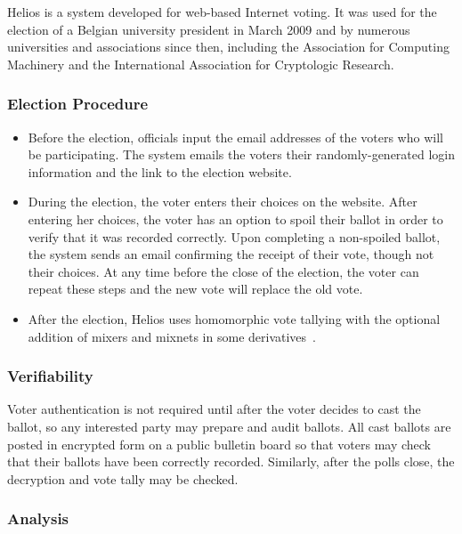 Helios is a system developed for web-based Internet voting. It was
used for the election of a Belgian university president in March 2009
and by numerous universities and associations since then, including
the Association for Computing Machinery and the International
Association for Cryptologic Research.

\subsubsection{Election Procedure}

\begin{itemize}

\item Before the election, officials input the email addresses of the
  voters who will be participating. The system emails the voters their
  randomly-generated login information and the link to the election
  website.

\item During the election, the voter enters their choices on the
  website. After entering her choices, the voter has an option to
  spoil their ballot in order to verify that it was recorded
  correctly. Upon completing a non-spoiled ballot, the system sends an
  email confirming the receipt of their vote, though not their
  choices. At any time before the close of the election, the voter can
  repeat these steps and the new vote will replace the old vote.

\item After the election, Helios uses homomorphic vote tallying with
  the optional addition of mixers and mixnets in some
  derivatives~\cite{bulens2011,tsoukalas2013}.

\end{itemize}

\subsubsection{Verifiability}

Voter authentication is not required until after the voter decides to
cast the ballot, so any interested party may prepare and audit
ballots. All cast ballots are posted in encrypted form on a public
bulletin board so that voters may check that their ballots have been
correctly recorded. Similarly, after the polls close, the decryption
and vote tally may be checked.

\subsubsection{Analysis}


